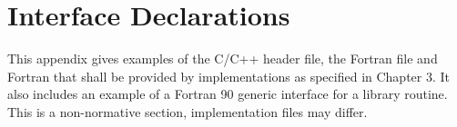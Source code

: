 %
%
%
%
%
%
%
%
%
%
%
%
%



\chapter{Interface Declarations}
\label{chap:Interface Declarations}
This appendix gives examples of the C/C++ header file, the Fortran  file and
Fortran  that shall be provided by implementations as specified in Chapter 3. It
also includes an example of a Fortran 90 generic interface for a library routine. This is a
non-normative section, implementation files may differ.




